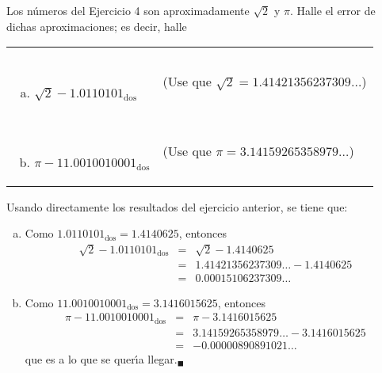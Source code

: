 \begin{enunciado}
 Los n\'umeros del Ejercicio 4 son aproximadamente $\sqrt{2}$ y $\pi$. Halle el error de dichas aproximaciones; es decir, halle
 \newline 
 \begin{tabular}{m{5cm}m{10cm}}
  \raggedleft $\phantom{0}$
  \begin{enumerate}[(a)]
   \item $\sqrt{2} - 1.0110101_{\text{dos}}$ 
  \end{enumerate}
  & (Use que $\sqrt{2} = 1.41421356237309\ldots$) \\ \vspace{-0.8cm} $\phantom{0}$
  \begin{enumerate}[(a)]
   \setcounter{enumii}{1}
   \item $\pi - 11.0010010001_{\text{dos}}$ 
  \end{enumerate}
  & \vspace{-0.8cm} (Use que $\pi = 3.14159265358979\ldots$)
 \end{tabular}
\end{enunciado}

\begin{solucion}
 Usando directamente los resultados del ejercicio anterior, se tiene que:
 \begin{enumerate}[(a)]
  \item Como $1.0110101_{\text{dos}} = 1.4140625$, entonces 
  \begin{eqnarray*}
   \sqrt{2} - 1.0110101_{\text{dos}} & = & \sqrt{2} - 1.4140625 \\
   & = & 1.41421356237309\ldots - 1.4140625 \\
   & = & 0.00015106237309\ldots
  \end{eqnarray*}

  \item Como $11.0010010001_{\text{dos}} = 3.1416015625$, entonces 
  \begin{eqnarray*}
   \pi - 11.0010010001_{\text{dos}} & = & \pi - 3.1416015625 \\
   & = & 3.14159265358979\ldots - 3.1416015625 \\
   & = & -0.00000890891021\ldots
  \end{eqnarray*}
  que es a lo que se quer\'{\i}a llegar.${}_{\blacksquare}$
 \end{enumerate}
\end{solucion}
